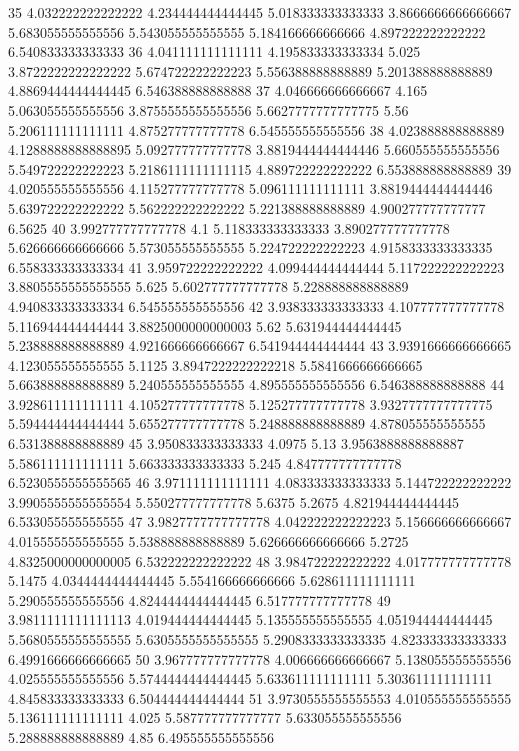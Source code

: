 35 4.032222222222222 4.234444444444445 5.018333333333333 3.8666666666666667 5.683055555555556 5.543055555555555 5.184166666666666 4.897222222222222 6.540833333333333
36 4.041111111111111 4.195833333333334 5.025 3.8722222222222222 5.674722222222223 5.556388888888889 5.201388888888889 4.8869444444444445 6.546388888888888
37 4.046666666666667 4.165 5.063055555555556 3.8755555555555556 5.6627777777777775 5.56 5.206111111111111 4.875277777777778 6.545555555555556
38 4.023888888888889 4.1288888888888895 5.092777777777778 3.8819444444444446 5.660555555555556 5.549722222222223 5.2186111111111115 4.889722222222222 6.553888888888889
39 4.020555555555556 4.115277777777778 5.096111111111111 3.8819444444444446 5.639722222222222 5.562222222222222 5.221388888888889 4.900277777777777 6.5625
40 3.992777777777778 4.1 5.118333333333333 3.890277777777778 5.626666666666666 5.573055555555555 5.224722222222223 4.9158333333333335 6.558333333333334
41 3.959722222222222 4.099444444444444 5.117222222222223 3.8805555555555555 5.625 5.602777777777778 5.228888888888889 4.940833333333334 6.545555555555556
42 3.938333333333333 4.107777777777778 5.116944444444444 3.8825000000000003 5.62 5.631944444444445 5.238888888888889 4.921666666666667 6.541944444444444
43 3.9391666666666665 4.123055555555555 5.1125 3.8947222222222218 5.5841666666666665 5.663888888888889 5.240555555555555 4.895555555555556 6.546388888888888
44 3.928611111111111 4.105277777777778 5.125277777777778 3.9327777777777775 5.594444444444444 5.655277777777778 5.248888888888889 4.878055555555555 6.531388888888889
45 3.950833333333333 4.0975 5.13 3.9563888888888887 5.586111111111111 5.663333333333333 5.245 4.847777777777778 6.5230555555555565
46 3.971111111111111 4.083333333333333 5.144722222222222 3.9905555555555554 5.550277777777778 5.6375 5.2675 4.821944444444445 6.533055555555555
47 3.9827777777777778 4.042222222222223 5.156666666666667 4.015555555555555 5.538888888888889 5.626666666666666 5.2725 4.8325000000000005 6.532222222222222
48 3.984722222222222 4.017777777777778 5.1475 4.0344444444444445 5.554166666666666 5.628611111111111 5.290555555555556 4.8244444444444445 6.517777777777778
49 3.9811111111111113 4.019444444444445 5.135555555555555 4.051944444444445 5.5680555555555555 5.6305555555555555 5.2908333333333335 4.823333333333333 6.4991666666666665
50 3.967777777777778 4.006666666666667 5.138055555555556 4.025555555555556 5.5744444444444445 5.633611111111111 5.303611111111111 4.845833333333333 6.504444444444444
51 3.9730555555555553 4.010555555555555 5.136111111111111 4.025 5.587777777777777 5.633055555555556 5.288888888888889 4.85 6.495555555555556
